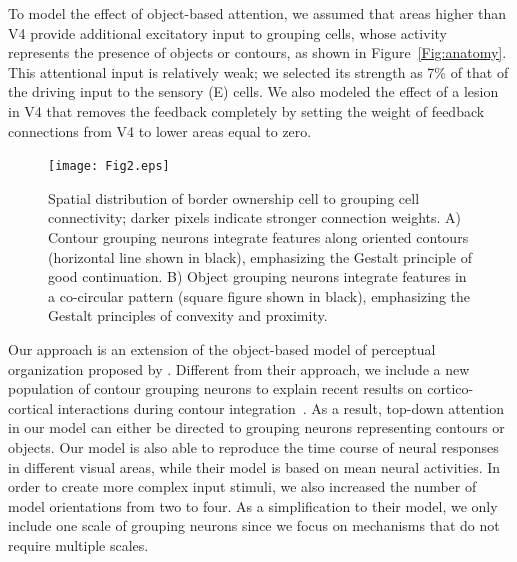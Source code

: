 {To model the effect of
 object-based
% 
attention, we assumed that areas higher
than V4 provide additional excitatory input to grouping cells, whose
activity represents the presence of objects or contours,
 as shown in Figure~\ref{Fig:anatomy}. This attentional input is
 relatively weak; 
we selected its strength as 7\% of that of the driving input to the
sensory (E) cells. We also modeled the effect of a lesion in V4 that removes the feedback completely by setting the weight of feedback connections from V4 to lower areas equal to zero.

\begin{figure}
\begin{center}
\texttt{[image: Fig2.eps]}
\end{center}
\caption{Spatial distribution of border ownership cell to grouping
  cell connectivity; darker pixels indicate stronger connection
  weights. A) Contour grouping neurons integrate features along
  oriented contours (horizontal line shown in black), emphasizing the
  Gestalt principle of good continuation. B) Object grouping neurons
  integrate features in a co-circular pattern (square figure shown in
  black), emphasizing the Gestalt principles of convexity and
  proximity.} 
\label{Fig:BG_projections}
\end{figure}

Our approach is an extension of the 
object-based model of perceptual organization proposed by
\cite{Mihalas_etal11b}. Different from their approach, we include a new population of contour grouping neurons to explain recent results on cortico-cortical interactions during contour integration~\citep{Chen_etal14}. As a result, top-down attention in our model can either be directed to grouping neurons representing contours or objects. Our model is also able to reproduce the time course of neural responses in different visual areas, while their model is based on mean neural activities. In order to create more complex input stimuli, we also increased the number of model orientations from two to four. As a simplification to their model, we only include one scale of grouping neurons since we focus on mechanisms that do not require multiple scales. 

}
